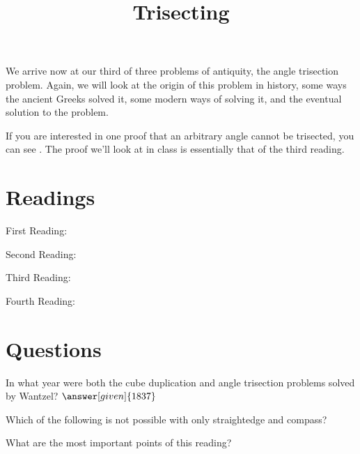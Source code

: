 \documentclass{ximera}
\title{Trisecting}
\begin{document}
\begin{abstract}
\end{abstract}
\maketitle

We arrive now at our third of three problems of antiquity, the angle trisection problem.  Again, we will look at the origin of this problem in history, some ways the ancient Greeks solved it, some modern ways of solving it, and the eventual solution to the problem.

If you are interested in one proof that an arbitrary angle cannot be trisected, you can see .  The proof we'll look at in class is essentially that of the third reading.


\section{Readings}

First Reading: 

Second Reading: 

Third Reading: 

Fourth Reading: 




\section{Questions}

\begin{question}
In what year were both the cube duplication and angle trisection problems solved by Wantzel? $\answer[given]{1837}$
\end{question}


\begin{question}
Which of the following is not possible with only straightedge and compass?
\begin{multipleChoice}
\end{multipleChoice}
\end{question}




\begin{question}
What are the most important points of this reading?
\begin{freeResponse}
\end{freeResponse}
\end{question}
\end{document}
